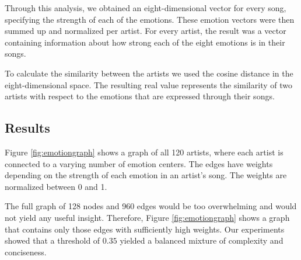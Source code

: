\documentclass[10pt,a4paper]{article}
\begin{document}
	Through this analysis, we obtained an eight-dimensional vector for every song, specifying the strength of each of the emotions. These emotion vectors were then summed up and normalized per artist. For every artist, the result was a vector containing information about how strong each of the eight emotions is in their songs.
	
	To calculate the similarity between the artists we used the cosine distance in the eight-dimensional space. The resulting real value represents the similarity of two artists with respect to the emotions that are expressed through their songs.
	
		\subsection{Results}
		Figure \ref{fig:emotiongraph} shows a graph of all 120 artists, where each artist is connected to a varying number of emotion centers. The edges have weights depending on the strength of each emotion in an artist's song. The weights are normalized between 0 and 1.
		
		The full graph of 128 nodes and 960 edges would be too overwhelming and would not yield any useful insight. Therefore, Figure \ref{fig:emotiongraph} shows a graph that contains only those edges with sufficiently high weights. Our experiments showed that a threshold of $0.35$ yielded a balanced mixture of complexity and conciseness.
		
\end{document}
